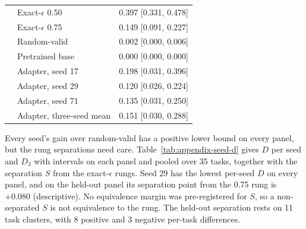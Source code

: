 \begin{table}[t]
\begin{tabular}{@{}lll@{}}
 & Exact-$\epsilon$ 0.50 & 0.397 [0.331, 0.478] \\
 & Exact-$\epsilon$ 0.75 & 0.149 [0.091, 0.227] \\
 & Random-valid & 0.002 [0.000, 0.006] \\
 & Pretrained base & 0.000 [0.000, 0.000] \\
 & Adapter, seed 17 & 0.198 [0.031, 0.396] \\
 & Adapter, seed 29 & 0.120 [0.026, 0.224] \\
 & Adapter, seed 71 & 0.135 [0.031, 0.250] \\
 & Adapter, three-seed mean & 0.151 [0.030, 0.288] \\
\midrule
\bottomrule
\end{tabular}
\end{table}

Every seed's gain over random-valid has a positive lower bound on every panel, but the rung separations need care. Table~\ref{tab:appendix-seed-d} gives $D$ per seed and $D_3$ with intervals on each panel and pooled over 35 tasks, together with the separation $S$ from the exact-$\epsilon$ rungs. Seed 29 has the lowest per-seed $D$ on every panel, and on the held-out panel its separation point from the 0.75 rung is $+0.080$ (descriptive). No equivalence margin was pre-registered for $S$, so a non-separated $S$ is not equivalence to the rung. The held-out separation rests on 11 task clusters, with 8 positive and 3 negative per-task differences.

